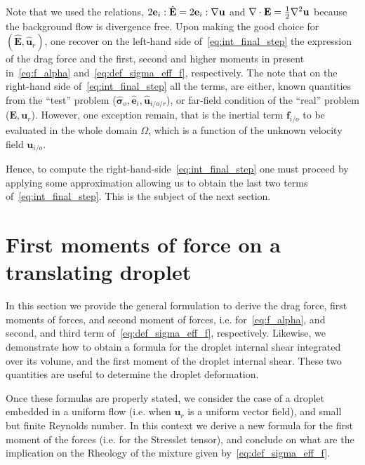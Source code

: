 Note that we used the relations, $2{\textbf{e}_i} : \hat{\textbf{E}} = 2{\textbf{e}_i} : {\mathbf{\nabla}\textbf{u}}$ and $\mathbf{\nabla}\cdot\textbf{E} = \frac{1}{2}\mathbf{\nabla}^2 \textbf{u}$ because the background flow is divergence free. 
Upon making the good choice for $(\hat{\textbf{E}}, \hat{\textbf{u}}_r)$, one recover on the left-hand side of~\ref{eq:int_final_step} the expression of the drag force and the first, second and higher moments in present in~\ref{eq:f_alpha} and~\ref{eq:def_sigma_eff_f}, respectively. 
The note that on the right-hand side of~\ref{eq:int_final_step} all the terms, are either, known quantities from the ``test'' problem ($\hat{\bm\sigma}_{o},\hat{\textbf{e}}_i, \hat{\textbf{u}}_{i/o/r}$), or far-field condition of the ``real'' problem ($\textbf{E},\textbf{u}_r$). 
However, one exception remain, that is the inertial term $\textbf{f}_{i/o}$ to be evaluated in the whole domain $\Omega$, which is a function of the unknown velocity field $\textbf{u}_{i/o}$. 

Hence, to compute the right-hand-side~\ref{eq:int_final_step} one must proceed by applying some approximation allowing us to obtain the last two terms of~\ref{eq:int_final_step}. 
This is the subject of the next section. 




\section{First moments of force on a translating droplet}

In this section we provide the general formulation to derive the drag force, first moments of forces, and second moment of forces, i.e. for~\ref{eq:f_alpha}, and second, and third term of~\ref{eq:def_sigma_eff_f}, respectively. 
Likewise, we demonstrate how to obtain a formula for the droplet internal shear integrated over its volume, and the first moment of the droplet internal shear.
These two quantities are useful to determine the droplet deformation.  

Once these formulas are properly stated, we consider the case of a droplet embedded in a uniform flow (i.e. when $\textbf{u}_r$ is a uniform vector field), and small but finite Reynolds number. 
In this context we derive a new formula for the first moment of the forces (i.e. for the Stresslet tensor), and conclude on what are the implication on the Rheology of the mixture given by~\ref{eq:def_sigma_eff_f}. 



